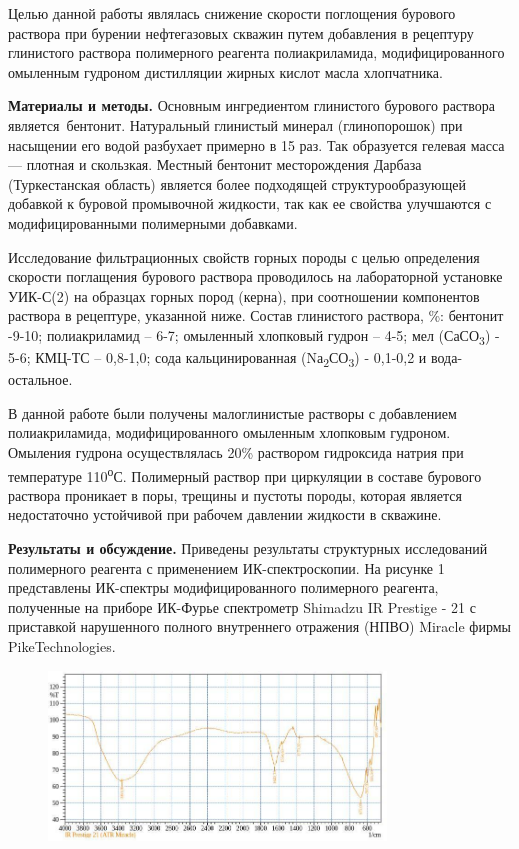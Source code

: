 Целью данной работы являлась снижение скорости поглощения бурового
раствора при бурении нефтегазовых скважин путем добавления в рецептуру
глинистого раствора полимерного реагента полиакриламида,
модифицированного омыленным гудроном дистилляции жирных кислот масла
хлопчатника.

{\bfseries Материалы и методы.} Основным ингредиентом глинистого бурового
раствора является~бентонит. Натуральный глинистый минерал (глинопорошок)
при насыщении его водой разбухает примерно в 15 раз. Так образуется
гелевая масса --- плотная и скользкая. Местный бентонит месторождения
Дарбаза (Туркестанская область) является более подходящей
структурообразующей добавкой к буровой промывочной жидкости, так как ее
свойства улучшаются с модифицированными полимерными добавками.

Исследование фильтрационных свойств горных породы с целью определения
скорости поглащения бурового раствора проводилось на лабораторной
установке УИК-С(2) на образцах горных пород (керна), при соотношении
компонентов раствора в рецептуре, указанной ниже. Состав глинистого
раствора, \%: бентонит -9-10; полиакриламид -- 6-7; омыленный хлопковый
гудрон -- 4-5; мел (СаСО\textsubscript{3}) - 5-6; КМЦ-ТС -- 0,8-1,0;
сода кальцинированная (Nа\textsubscript{2}СО\textsubscript{3}) - 0,1-0,2
и вода-остальное.

В данной работе были получены малоглинистые растворы с добавлением
полиакриламида, модифицированного омыленным хлопковым гудроном. Омыления
гудрона осуществлялась 20\% раствором гидроксида натрия при температуре
110\textsuperscript{о}С. Полимерный раствор при циркуляции в составе
бурового раствора проникает в поры, трещины и пустоты породы, которая
является недостаточно устойчивой при рабочем давлении жидкости в
скважине.

{\bfseries Результаты и обсуждение.} Приведены результаты структурных
исследований полимерного реагента с применением ИК-спектроскопии. На
рисунке 1 представлены ИК-спектры модифицированного полимерного
реагента, полученные на приборе ИК-Фурье спектрометр Shimadzu IR
Prestige - 21 с приставкой нарушенного полного внутреннего отражения
(НПВО) Miracle фирмы PikeTechnologies.

\begin{figure}[H]
	\centering
	\includegraphics[width=0.8\textwidth]{assets/1262}
	\caption*{}
\end{figure}


